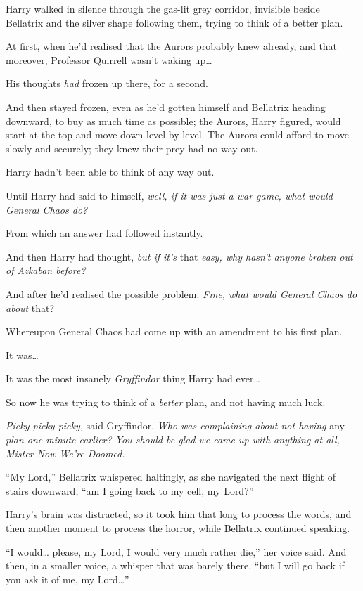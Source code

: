 Harry walked in silence through the gas-lit grey corridor, invisible
beside Bellatrix and the silver shape following them, trying to think of
a better plan.

At first, when he'd realised that the Aurors probably knew already, and
that moreover, Professor Quirrell wasn't waking up\ldots{}

His thoughts \emph{had} frozen up there, for a second.

And then stayed frozen, even as he'd gotten himself and Bellatrix
heading downward, to buy as much time as possible; the Aurors, Harry
figured, would start at the top and move down level by level. The Aurors
could afford to move slowly and securely; they knew their prey had no
way out.

Harry hadn't been able to think of any way out.

Until Harry had said to himself, \emph{well, if it was just a war game,
what would General Chaos do?}

From which an answer had followed instantly.

And then Harry had thought, \emph{but if it's} that \emph{easy, why
hasn't anyone broken out of Azkaban before?}

And after he'd realised the possible problem: \emph{Fine, what would
General Chaos do about} that?

Whereupon General Chaos had come up with an amendment to his first plan.

It was\ldots{}

It was the most insanely \emph{Gryffindor} thing Harry had ever\ldots{}

So now he was trying to think of a \emph{better} plan, and not having
much luck.

\emph{Picky picky picky,} said Gryffindor. \emph{Who was complaining
about not having} any \emph{plan one minute earlier? You should be glad
we came up with anything at all, Mister Now-We're-Doomed.}

``My Lord,'' Bellatrix whispered haltingly, as she navigated the next
flight of stairs downward, ``am I going back to my cell, my Lord?''

Harry's brain was distracted, so it took him that long to process the
words, and then another moment to process the horror, while Bellatrix
continued speaking.

``I would\ldots{} please, my Lord, I would very much rather die,'' her
voice said. And then, in a smaller voice, a whisper that was barely
there, ``but I will go back if you ask it of me, my Lord\ldots{}''

